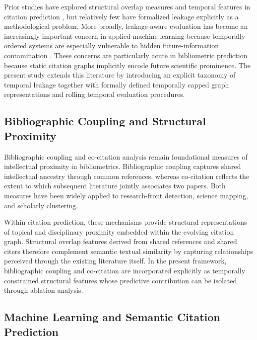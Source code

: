 \documentclass[11pt,a4paper]{article}
\begin{document}
Prior studies have explored structural overlap measures and temporal features in citation prediction \citep{shibata2012link, chakraborty2015towards}, but relatively few have formalized leakage explicitly as a methodological problem. More broadly, leakage-aware evaluation has become an increasingly important concern in applied machine learning because temporally ordered systems are especially vulnerable to hidden future-information contamination \citep{fortunato2018science}. These concerns are particularly acute in bibliometric prediction because static citation graphs implicitly encode future scientific prominence. The present study extends this literature by introducing an explicit taxonomy of temporal leakage together with formally defined temporally capped graph representations and rolling temporal evaluation procedures.

\subsection{Bibliographic Coupling and Structural Proximity}

Bibliographic coupling \citep{kessler1963bibliographic} and co-citation analysis \citep{small1973co} remain foundational measures of intellectual proximity in bibliometrics. Bibliographic coupling captures shared intellectual ancestry through common references, whereas co-citation reflects the extent to which subsequent literature jointly associates two papers. Both measures have been widely applied to research-front detection, science mapping, and scholarly clustering.

Within citation prediction, these mechanisms provide structural representations of topical and disciplinary proximity embedded within the evolving citation graph. Structural overlap features derived from shared references and shared citers therefore complement semantic textual similarity by capturing relationships perceived through the existing literature itself. In the present framework, bibliographic coupling and co-citation are incorporated explicitly as temporally constrained structural features whose predictive contribution can be isolated through ablation analysis.

\subsection{Machine Learning and Semantic Citation Prediction}
\end{document}
